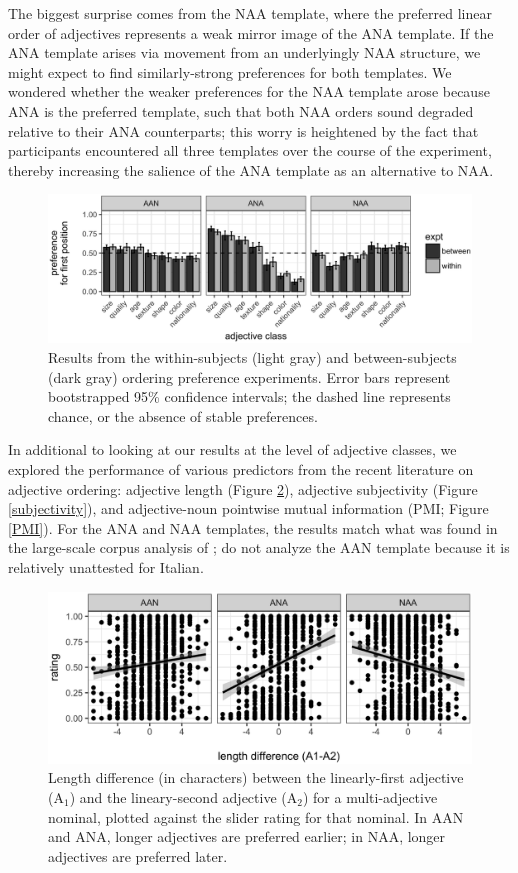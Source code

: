 \documentclass[11pt]{article}
\begin{document}
The biggest surprise comes from the NAA template, where the preferred linear order of adjectives represents a weak mirror image of the ANA template. If the ANA template arises via movement from an underlyingly NAA structure, we might expect to find similarly-strong preferences for both templates. We wondered whether the weaker preferences for the NAA template arose because ANA is the preferred template, such that both NAA orders sound degraded relative to their ANA counterparts; this worry is heightened by the fact that participants encountered all three templates over the course of the experiment, thereby increasing the salience of the ANA template as an alternative to NAA.  

\begin{figure}[htb]
	\centering
	\includegraphics[width=\textwidth]{class_distance_combined.eps}
	\caption{Results from the within-subjects (light gray) and between-subjects (dark gray) ordering preference experiments. Error bars represent bootstrapped 95\% confidence intervals; the dashed line represents chance, or the absence of stable preferences.}
	\label{results}
\end{figure}

In additional to looking at our results at the level of adjective classes, we explored the performance of various predictors from the recent literature on adjective ordering: adjective length (Figure \ref{length}), adjective subjectivity (Figure \ref{subjectivity}), and adjective-noun pointwise mutual information (PMI; Figure \ref{PMI}). For the ANA and NAA templates, the results match what was found in the large-scale corpus analysis of \cite{dyeretal2023}; \citeauthor{dyeretal2023} do not analyze the AAN template because it is relatively unattested for Italian.

\begin{figure}[ht]
	\centering
	\includegraphics[width=.82\textwidth]{length.eps}
	\caption{Length difference (in characters) between the linearly-first adjective (A$_1$) and the lineary-second adjective (A$_2$) for a multi-adjective nominal, plotted against the slider rating for that nominal. In AAN and ANA, longer adjectives are preferred earlier; in NAA, longer adjectives are preferred later.}
	\label{length}
\end{figure}
\end{document}
